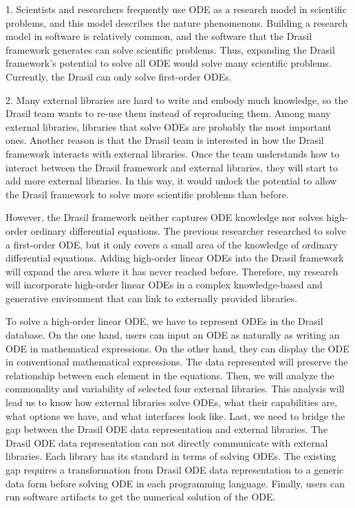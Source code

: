 1. Scientists and researchers frequently use ODE as a research model in scientific problems, and this model describes the nature phenomenons. Building a research model in software is relatively common, and the software that the Drasil framework generates can solve scientific problems. Thus, expanding the Drasil framework's potential to solve all ODE would solve many scientific problems. Currently, the Drasil can only solve first-order ODEs.

2. Many external libraries are hard to write and embody much knowledge, so the Drasil team wants to re-use them instead of reproducing them. Among many external libraries, libraries that solve ODEs are probably the most important ones. Another reason is that the Drasil team is interested in how the Drasil framework interacts with external libraries. Once the team understands how to interact between the Drasil framework and external libraries, they will start to add more external libraries. In this way, it would unlock the potential to allow the Drasil framework to solve more scientific problems than before. 

However, the Drasil framework neither captures ODE knowledge nor solves high-order ordinary differential equations. The previous researcher researched to solve a first-order ODE, but it only covers a small area of the knowledge of ordinary differential equations. Adding high-order linear ODEs into the Drasil framework will expand the area where it has never reached before. Therefore, my research will incorporate high-order linear ODEs in a complex knowledge-based and generative environment that can link to externally provided libraries.

To solve a high-order linear ODE, we have to represent ODEs in the Drasil database. On the one hand, users can input an ODE as naturally as writing an ODE in mathematical expressions. On the other hand, they can display the ODE in conventional mathematical expressions. The data represented will preserve the relationship between each element in the equations. Then, we will analyze the commonality and variability of selected four external libraries. This analysis will lead us to know how external libraries solve ODEs, what their capabilities are, what options we have, and what interfaces look like. Last, we need to bridge the gap between the Drasil ODE data representation and external libraries. The Drasil ODE data representation can not directly communicate with external libraries. Each library has its standard in terms of solving ODEs. The existing gap requires a transformation from Drasil ODE data representation to a generic data form before solving ODE in each programming language. Finally, users can run software artifacts to get the numerical solution of the ODE.


